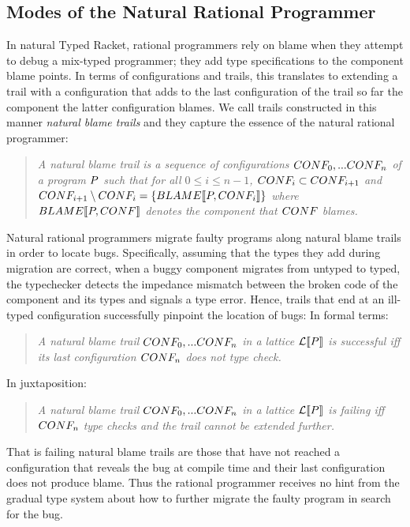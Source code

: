 \subsection{Modes of the Natural Rational Programmer} \label{sub:natural}

In natural Typed Racket, rational programmers rely on blame when they
attempt to debug a mix-typed programmer; they add type specifications to
the component blame points. In terms of configurations and trails, this
translates to extending a trail with a configuration that adds to the
last configuration of the trail so far the component the latter configuration
blames.  We call trails constructed in this manner \emph{natural blame
trails} and they capture the essence of the natural rational programmer:

\begin{quote}
\it 
A natural blame trail
is a sequence of configurations $CONF_0,...CONF_n$ of a program
$P$  such that for all $0 \leq i \leq n - 1$, $CONF_i \subset CONF_{i+1}$ and
  $CONF_{i+1} \setminus CONF_i =\{BLAME\llbracket P, CONF_i\rrbracket\}$ where
  $BLAME\llbracket P, CONF\rrbracket$ denotes the component that $CONF$ blames.
\end{quote}

Natural rational programmers migrate faulty programs along natural blame
trails in order to locate bugs. Specifically, assuming that the types 
they add during migration are correct, when a buggy component migrates
from untyped to typed, the typechecker detects the impedance mismatch
between the broken code of the component and its types and signals a type
error. Hence, trails that end at an ill-typed configuration successfully 
pinpoint the location of bugs:
In formal terms:
\begin{quote}
\it 
A natural blame trail $CONF_0,...CONF_n$ in a lattice $\mathcal{L}\llbracket P\rrbracket$ is
\emph{successful}  iff its last configuration $CONF_n$ does not type check.
  \end{quote}
  In juxtaposition:
\begin{quote}
\it 
A natural blame trail $CONF_0,...CONF_n$ in a lattice $\mathcal{L}\llbracket P\rrbracket$ is
\emph{failing}  iff $CONF_n$ type checks and the trail cannot be extended
  further. 
 \end{quote}
\noindent 
That is failing natural blame trails are those that have not reached a configuration that reveals
the bug at compile time and their last configuration does not produce
blame. Thus the rational programmer receives no hint from the gradual type
system about how to further migrate the faulty program in search for the
bug.

